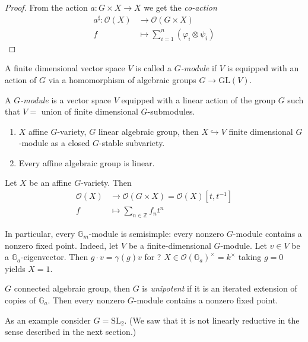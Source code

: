 \begin{proof}
From the action $a:G \times X \to X$ we get
the {\it co-action}
$$
\begin{aligned}
a^\sharp: \mathcal{O}(X) &\longrightarrow
\mathcal{O}(G \times X) \\
f &\longmapsto \sum_{i=1}^n(\varphi_i \otimes
\psi_i)
\end{aligned}
$$
\end{proof}

\begin{definition}
\label{definition-G-module}
A finite dimensional vector space $V$ is
called a {\it $G$-module} if $V$ is equipped
with an action of $G$ via a homomorphism of
algebraic groups $G \to \text{GL}(V)$.

A  {\it $G$-module} is a vector space $V$
equipped with a linear action of the group
$G$ such that $V=$ union of finite
dimensional $G$-submodules.
\end{definition}

\begin{proposition}
\label{proposition-G-modules}
\begin{enumerate}
\item $X$ affine $G$-variety, $G$ linear
algebraic group, then $X
\hookrightarrow  V$ finite dimensional
$G$-module as a closed $G$-stable
subvariety.
\item Every affine algebraic group is linear.
\end{enumerate}
\end{proposition}

Let $X$ be an affine $G$-variety. Then
$$
\begin{aligned}
\mathcal{O}(X) &\longrightarrow
\mathcal{O}(G\times X)
=\mathcal{O}(X)[t,t^{-1}] \\
f &\longmapsto \sum_{n \in \mathbb{Z}}f_n t^n
\end{aligned}
$$

In particular, every $\mathbb{G}_m$-module is
semisimple: every nonzero $G$-module contains
a nonzero fixed point. Indeed, let $V$ be a
finite-dimensional $G$-module. Let $v \in V$
be a $\mathbb{G}_a$-eigenvector. Then $g\cdot
v=\gamma(g)v$ for ? $X \in
\mathcal{O}(\mathbb{G}_a)^{\times}=k^{\times}
$
taking $g=0$ yields $X=1$.

$G$ connected algebraic group, then $G$ is
{\it unipotent} if it is an iterated
extension of copies of $\mathbb{G}_a$. Then
every nonzero $G$-module contains a nonzero
fixed point.

As an example consider $G=\text{SL}_2$. (We
saw that it is not linearly reductive in the
sense described in the next section.)

